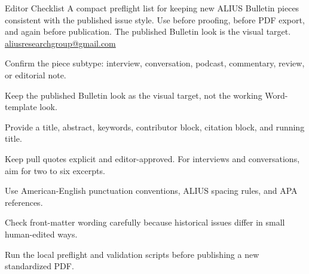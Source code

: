 \documentclass[11pt]{article}
\begin{document}
\guideHeader
  {Editor Checklist}
  {A compact preflight list for keeping new ALIUS Bulletin pieces consistent with the published issue style.}
  {Use before proofing, before PDF export, and again before publication.}
  {The published Bulletin look is the visual target.}
  {\href{mailto:aliusresearchgroup@gmail.com}{aliusresearchgroup@gmail.com}}


\begin{guideChecklist}
\item Confirm the piece subtype: interview, conversation, podcast, commentary, review, or editorial note.
\item Keep the published Bulletin look as the visual target, not the working Word-template look.
\item Provide a title, abstract, keywords, contributor block, citation block, and running title.
\item Keep pull quotes explicit and editor-approved. For interviews and conversations, aim for two to six excerpts.
\item Use American-English punctuation conventions, ALIUS spacing rules, and APA references.
\item Check front-matter wording carefully because historical issues differ in small human-edited ways.
\item Run the local preflight and validation scripts before publishing a new standardized PDF.
\end{guideChecklist}
\end{document}
